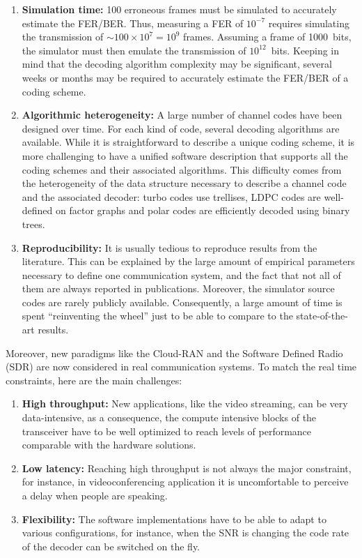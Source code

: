 \begin{enumerate}
  \item \textbf{Simulation time:}
    100 erroneous frames must be simulated to accurately estimate the FER/BER.
    Thus, measuring a FER of $10^{-7}$ requires simulating the transmission of
    $\sim100\times 10^7=10^9$ frames. Assuming a frame of 1000~bits, the
    simulator must then emulate the transmission of $10^{12}$~bits. Keeping in
    mind that the decoding algorithm complexity may be significant, several
    weeks or months may be required to accurately estimate the FER/BER of a
    coding scheme.

  \item \textbf{Algorithmic heterogeneity:} A large number of channel codes have
    been designed over time. For each kind of code, several decoding algorithms
    are available. While it is straightforward to describe a unique coding
    scheme, it is more challenging to have a unified software description that
    supports all the coding schemes and their associated algorithms. This
    difficulty comes from the heterogeneity of the data structure necessary to
    describe a channel code and the associated decoder: turbo codes use
    trellises, LDPC codes are well-defined on factor graphs and polar codes are
    efficiently decoded using binary trees.

  \item \textbf{Reproducibility:} It is usually tedious to reproduce results
    from the literature. This can be explained by the large amount of empirical
    parameters necessary to define one communication system, and the fact that
    not all of them are always reported in publications. Moreover, the simulator
    source codes are rarely publicly available. Consequently, a large amount of
    time is spent ``reinventing the wheel'' just to be able to compare to the
    state-of-the-art results.
\end{enumerate}

Moreover, new paradigms like the Cloud-RAN and the Software Defined Radio (SDR)
are now considered in real communication systems. To match the real time
constraints, here are the main challenges:

\begin{enumerate}
  \item \textbf{High throughput:} New applications, like the video streaming,
    can be very data-intensive, as a consequence, the compute intensive blocks
    of the transceiver have to be well optimized to reach levels of performance
    comparable with the hardware solutions.
  \item \textbf{Low latency:} Reaching high throughput is not always the major
    constraint, for instance, in videoconferencing application it is
    uncomfortable to perceive a delay when people are speaking.
  \item \textbf{Flexibility:} The software implementations have to be able to
    adapt to various configurations, for instance, when the SNR is changing
    the code rate of the decoder can be switched on the fly.
\end{enumerate}

